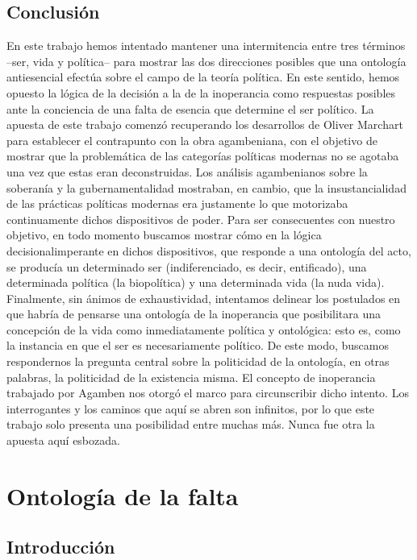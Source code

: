 \documentclass{book}
\begin{document}
\section{Conclusión}

En este trabajo hemos intentado mantener una intermitencia entre tres
términos --ser, vida y política-- para mostrar las dos direcciones
posibles que una ontología antiesencial efectúa sobre el campo de la
teoría política. En este sentido, hemos opuesto la lógica de la decisión
a la de la inoperancia como respuestas posibles ante la conciencia de
una falta de esencia que determine el ser político. La apuesta de este
trabajo comenzó recuperando los desarrollos de Oliver Marchart para
establecer el contrapunto con la obra agambeniana, con el objetivo de
mostrar que la problemática de las categorías políticas modernas no se
agotaba una vez que estas eran deconstruidas. Los análisis agambenianos
sobre la soberanía y la gubernamentalidad mostraban, en cambio, que la
insustancialidad de las prácticas políticas modernas era justamente lo
que motorizaba continuamente dichos dispositivos de poder. Para ser
consecuentes con nuestro objetivo, en todo momento buscamos mostrar cómo
en la lógica decisionalimperante en dichos dispositivos, que responde a
una ontología del acto, se producía un determinado ser (indiferenciado,
es decir, entificado), una determinada política (la biopolítica) y una
determinada vida (la nuda vida). Finalmente, sin ánimos de
exhaustividad, intentamos delinear los postulados en que habría de
pensarse una ontología de la inoperancia que posibilitara una concepción
de la vida como inmediatamente política y ontológica: esto es, como la
instancia en que el ser es necesariamente político. De este modo,
buscamos respondernos la pregunta central sobre la politicidad de la
ontología, en otras palabras, la politicidad de la existencia misma. El
concepto de inoperancia trabajado por Agamben nos otorgó el marco para
circunscribir dicho intento. Los interrogantes y los caminos que aquí se
abren son infinitos, por lo que este trabajo solo presenta una
posibilidad entre muchas más. Nunca fue otra la apuesta aquí esbozada.

\chapter{Ontología de la falta}
\author{Gala Aznarez Carini - Mercedes Vargas}

\section{Introducción}
\end{document}
